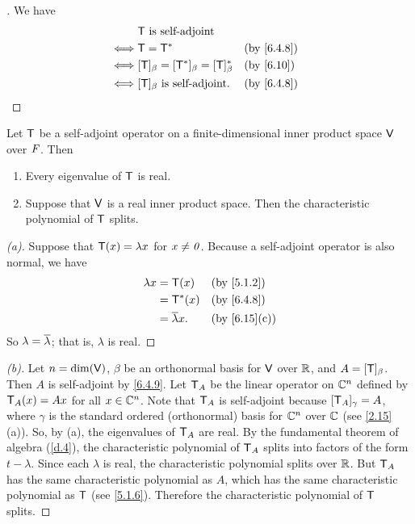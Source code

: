 \begin{proof}[]
	We have
	\begin{align*}
		     & \T \text{ is self-adjoint}                                     \\
		\iff & \T = \T^*                                      &  & \by{6.4.8} \\
		\iff & [\T]_{\beta} = [\T^*]_{\beta} = [\T]_{\beta}^* &  & \by{6.10}  \\
		\iff & [\T]_{\beta} \text{ is self-adjoint}.          &  & \by{6.4.8}
	\end{align*}
\end{proof}

\begin{lem}\label{6.4.10}
	Let \(\mathsf{T}\) be a self-adjoint operator on a finite-dimensional inner product space \(\mathsf{V}\) over \(\mathit{F}\).
	Then
	\begin{enumerate}
		\item Every eigenvalue of \(\mathsf{T}\) is real.
		\item Suppose that \(\mathsf{V}\) is a real inner product space.
		      Then the characteristic polynomial of \(\mathsf{T}\) splits.
	\end{enumerate}
\end{lem}

\begin{proof}[(a)]
	Suppose that \(\mathsf{T}(x) = \lambda x\) for \(x \neq \mathit{0}\).
	Because a self-adjoint operator is also normal, we have
	\begin{align*}
		\lambda x & = \T(x)             &  & \by{5.1.2}   \\
		          & = \T^*(x)           &  & \by{6.4.8}   \\
		          & = \conj{\lambda} x. &  & \by{6.15}[c]
	\end{align*}
	So \(\lambda = \overline{\lambda}\);
	that is, \(\lambda\) is real.
\end{proof}

\begin{proof}[(b)]
	Let \(n = \dim(\mathsf{V})\), \(\beta\) be an orthonormal basis for \(\mathsf{V}\) over \(\mathbb{R}\), and \(A = [\mathsf{T}]_{\beta}\).
	Then \(A\) is self-adjoint by \cref{6.4.9}.
	Let \(\mathsf{T}_A\) be the linear operator on \(\mathbb{C}^n\) defined by \(\mathsf{T}_A(x) = Ax\) for all \(x \in \mathbb{C}^n\).
	Note that \(\mathsf{T}_A\) is self-adjoint because \([\mathsf{T}_A]_{\gamma} = A\), where \(\gamma\) is the standard ordered (orthonormal) basis for \(\mathbb{C}^n\) over \(\mathbb{C}\) (see \cref{2.15}(a)).
	So, by (a), the eigenvalues of \(\mathsf{T}_A\) are real.
	By the fundamental theorem of algebra (\cref{d.4}), the characteristic polynomial of \(\mathsf{T}_A\) splits into factors of the form \(t - \lambda\).
	Since each \(\lambda\) is real, the characteristic polynomial splits over \(\mathbb{R}\).
	But \(\mathsf{T}_A\) has the same characteristic polynomial as \(A\), which has the same characteristic polynomial as \(\mathsf{T}\) (see \cref{5.1.6}).
	Therefore the characteristic polynomial of \(\mathsf{T}\) splits.
\end{proof}

